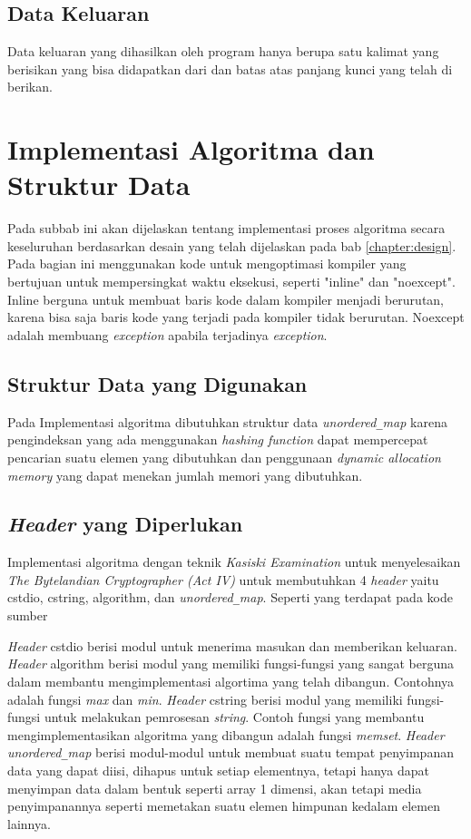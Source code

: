 \subsection{Data Keluaran}
Data keluaran yang dihasilkan oleh program hanya berupa satu kalimat yang berisikan \plaintext yang bisa didapatkan dari \ciphertext dan batas atas panjang kunci yang telah di berikan.

\section{Implementasi Algoritma dan Struktur Data}
Pada subbab ini akan dijelaskan tentang implementasi proses
algoritma secara keseluruhan berdasarkan desain yang telah
dijelaskan pada bab \ref{chapter:design}. Pada bagian ini menggunakan kode untuk mengoptimasi kompiler yang bertujuan untuk mempersingkat waktu eksekusi, seperti "inline" dan "noexcept". Inline berguna untuk membuat baris kode dalam kompiler menjadi berurutan, karena bisa saja baris kode yang terjadi pada kompiler tidak berurutan. Noexcept adalah membuang  \textit{exception} apabila terjadinya \textit{exception}.

\subsection{Struktur Data yang Digunakan}
Pada Implementasi algoritma dibutuhkan struktur data \textit{unordered}\verb|_|\textit{map} karena pengindeksan yang ada menggunakan \textit{hashing function} dapat mempercepat pencarian suatu elemen yang dibutuhkan dan penggunaan \textit{dynamic allocation memory} yang dapat menekan jumlah memori yang dibutuhkan.

\subsection{\textit{Header} yang Diperlukan}
Implementasi algoritma dengan teknik \textit{Kasiski Examination} untuk menyelesaikan \textit{The Bytelandian Cryptographer (Act IV)} untuk membutuhkan 4 \textit{header} yaitu cstdio, cstring, algorithm, dan \textit{unordered}\verb|_|\textit{map}. Seperti yang terdapat pada kode sumber



\textit{Header} cstdio berisi modul untuk menerima masukan dan
memberikan keluaran. \textit{Header} algorithm berisi modul yang memiliki fungsi-fungsi yang sangat berguna dalam membantu mengimplementasi algortima yang telah dibangun. Contohnya adalah fungsi \textit{max} dan \textit{min}. \textit{Header} cstring berisi modul yang memiliki fungsi-fungsi untuk melakukan pemrosesan \textit{string}. Contoh fungsi yang membantu mengimplementasikan algoritma yang dibangun adalah fungsi \textit{memset}. \textit{Header} \textit{unordered}\verb|_|\textit{map} berisi modul-modul untuk membuat suatu tempat penyimpanan data yang dapat diisi, dihapus untuk setiap elementnya, tetapi hanya dapat menyimpan data dalam bentuk seperti array 1 dimensi, akan tetapi media penyimpanannya seperti memetakan suatu elemen himpunan kedalam elemen lainnya. 

